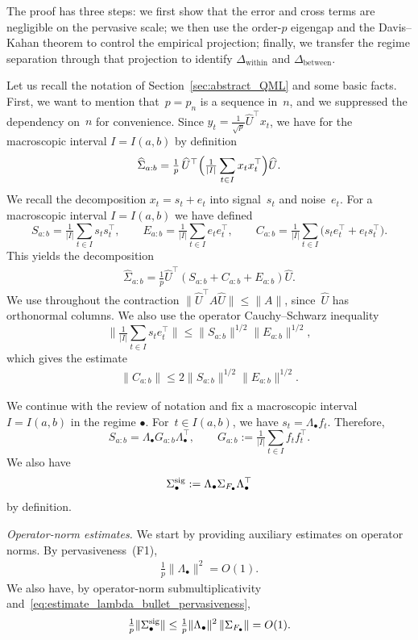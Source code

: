 \documentclass[10pt, letterpaper]{amsart}
\begin{document}
The proof has three steps: we first show that the error and cross terms are
negligible on the pervasive scale; we then use the order-$p$ eigengap and the
Davis--Kahan theorem to control the empirical projection; finally, we
transfer the regime separation through that projection to identify
$\Delta_{\mathrm{within}}$ and $\Delta_{\mathrm{between}}$.

Let us recall the notation of Section~\ref{sec:abstract_QML} and some basic facts. First, we want to mention that~$p=p_n$ is a sequence in~$n$, and we suppressed the dependency on~$n$ for convenience. Since
$y_t=\tfrac1{\sqrt p}\widehat U^{\top}x_t$, we have for the macroscopic interval
$I=I(a,b)$ by definition
\[
\widehat\Sigma_{a:b}
=\tfrac1p\,\widehat U^{\top}
\Bigl(\tfrac1{|I|}\sum_{t\in I}x_tx_t^{\top}\Bigr)
\widehat U.
\]
We recall the decomposition $x_t=s_t+e_t$ into signal~$s_t$ and noise~$e_t$. For a macroscopic interval $I=I(a,b)$ we have defined
\[
S_{a:b}=\tfrac1{|I|}\sum_{t\in I}s_ts_t^{\top},\qquad
E_{a:b}=\tfrac1{|I|}\sum_{t\in I}e_te_t^{\top},\qquad
C_{a:b}=\tfrac1{|I|}\sum_{t\in I}\bigl(s_te_t^{\top}+e_ts_t^{\top}\bigr).
\]
This yields the decomposition
\begin{align}
\widehat\Sigma_{a:b}
=\tfrac1p\widehat U^{\top}(S_{a:b}+C_{a:b}+E_{a:b})\widehat U.
\end{align}
We use throughout the contraction $\|\widehat U^{\top} A\widehat U\|\le\|A\|$, since~$\widehat U$ has orthonormal columns. We also use the operator Cauchy--Schwarz inequality
\[
\bigl\|\tfrac1{|I|}\sum_{t\in I}s_te_t^{\top}\bigr\|
\le
\|S_{a:b}\|^{1/2}\|E_{a:b}\|^{1/2},
\]
which gives the estimate
\begin{align}\label{equ:op_cauchy_schwarz}
\|C_{a:b}\|\le 2\|S_{a:b}\|^{1/2}\|E_{a:b}\|^{1/2}.
\end{align}

\smallskip

We continue with the review of notation and fix a macroscopic interval $I=I(a,b)$ in the regime $\bullet$. For~$t \in I(a,b)$, we have $s_t=\Lambda_\bullet f_t$. Therefore,
\[
S_{a:b}=\Lambda_\bullet G_{a:b}\Lambda_\bullet^{\top},
\qquad
G_{a:b}:=\tfrac1{|I|}\sum_{t\in I}f_tf_t^{\top}.
\]
We also have
\[
\Sigma_\bullet^{\rm sig}:=\Lambda_\bullet\Sigma_{F_\bullet}\Lambda_\bullet^{\top}
\]
by definition.

\smallskip

\noindent\emph{Operator-norm estimates.}
We start by providing auxiliary estimates on operator norms. By pervasiveness~(F1),
\begin{align}
\label{eq:estimate_lambda_bullet_pervasiveness}
\tfrac1p\|\Lambda_\bullet\|^2=O(1).
\end{align}
We also have, by operator-norm submultiplicativity and~\eqref{eq:estimate_lambda_bullet_pervasiveness},
\begin{align}\label{equ:signal_op_bounds_sigma_bullet}
\tfrac1p\|\Sigma_\bullet^{\rm sig}\|
\le
\tfrac1p\|\Lambda_\bullet\|^2\,\|\Sigma_{F_\bullet}\|
=O(1).
\end{align}
\end{document}
